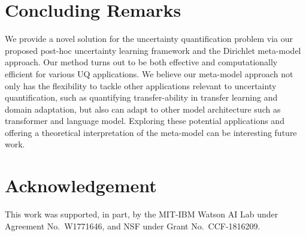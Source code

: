 
\section{Concluding Remarks} \label{sec:conclusion}

We provide a novel solution for the uncertainty quantification problem via our proposed post-hoc uncertainty learning framework and the Dirichlet meta-model approach.
Our method turns out to be both effective and computationally efficient for various UQ applications. We believe our meta-model approach not only has the flexibility to tackle other applications relevant to uncertainty quantification, such as quantifying transfer-ability in transfer learning and domain adaptation, but also can adapt to other model architecture such as transformer and language model. Exploring these potential applications and offering a theoretical interpretation of the meta-model can be interesting future work.


\section*{Acknowledgement}

This work was supported, in part, by the MIT-IBM Watson AI Lab under Agreement No.~W1771646, and NSF under Grant No.~CCF-1816209.
